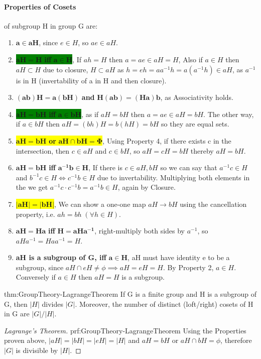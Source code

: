 \paragraph{Properties of Cosets} of subgroup H in group G are:
\begin{enumerate}
    \item $\mathbf{a \in aH}$, since $e \in H$, so $ae \in aH$.
    \item \colorbox{green}{$\mathbf{aH = H}$ \textbf{iff} $\mathbf{a \in H}$}, If $ah = H$ then $a = ae \in aH = H$, Also if $a \in H$ then $aH \subset H$ due to closure, $H \subset aH$ as $h = eh = aa^{-1}h = a(a^{-1}h) \in aH$, as $a^{-1}$ is in H (invertability of a in H and then closure).
    \item $\mathbf{(ab)H = a(bH)}$ \textbf{and} $\mathbf{H(ab) = (Ha)b}$, as Associativity holds.
    \item \colorbox{green}{$\mathbf{aH = bH}$ \textbf{iff} $\mathbf{a \in bH}$}, as if $aH = bH$ then $a = ae \in aH = bH$. The other way, if $a \in bH$ then $aH = (bh)H = b(hH) = bH$ so they are equal sets.
    \item \colorbox{yellow}{$\mathbf{aH = bH}$ \textbf{or} $\mathbf{aH \cap bH = \Phi}$}, Using Property 4, if there exists c in the intersection, then $c \in aH$ and $c \in bH$, so $aH = cH = bH$ thereby $aH = bH$.
    \item $\mathbf{aH = bH}$ \textbf{iff} $\mathbf{a^{-1}b \in H}$, If there is $c \in aH,bH$ so we can say that $a^{-1}c \in H$ and $b^{-1}c \in H \iff c^{-1}b \in H$ due to invertability. Multiplying both elements in the we get $a^{-1}c \cdot c^{-1}b = a^{-1}b \in H$, again by Closure.
    \item \colorbox{yellow}{$\mathbf{|aH| = |bH|}$}, We can show a one-one map $aH \rightarrow bH$ using the cancellation property, i.e. $ah = bh \; (\forall h \in H)$.
    \item $\mathbf{aH = Ha}$ \textbf{iff} $\mathbf{H = aHa^{-1}}$, right-multiply both sides by $a^{-1}$, so $aHa^{-1} = Haa^{-1} = H$.
    \item \textbf{aH is a subgroup of G, iff} $\mathbf{a \in H}$, aH must have identity e to be a subgroup, since $aH \cap eH \neq \phi \implies aH = eH = H$. By Property 2, $a \in H$. Conversely if $a \in H$ then $aH = H$ is a subgroup.
\end{enumerate}

\begin{theorem}{thm:GroupTheory-LagrangeTheorem}
    If G is a finite group and H is a subgroup of G, then $|H|$ divides $|G|$. Moreover, the number of distinct (loft/right) cosets of H in G are $|G|/|H|$.
\end{theorem}
\begin{proof}[Lagrange's Theorem]{prf:GroupTheory-LagrangeTheorem}
    Using the Properties proven above, $|aH| = |bH| = |eH| = |H|$ and $aH = bH$ or $aH \cap bH = \phi$, therefore $|G|$ is divisible by $|H|$.
\end{proof}

